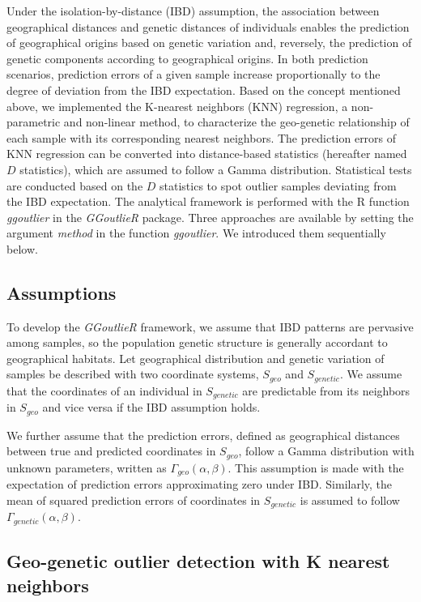 \documentclass[11pt]{article}
\begin{document}
Under the isolation-by-distance (IBD) assumption, the association between geographical distances and genetic distances of individuals enables the prediction of geographical origins based on genetic variation and, reversely, the prediction of genetic components according to geographical origins.
In both prediction scenarios, prediction errors of a given sample increase proportionally to the degree of deviation from the IBD expectation.
Based on the concept mentioned above, we implemented the K-nearest neighbors (KNN) regression, a non-parametric and non-linear method, to characterize the geo-genetic relationship of each sample with its corresponding nearest neighbors.
The prediction errors of KNN regression can be converted into distance-based statistics (hereafter named $D$ statistics), which are assumed to follow a Gamma distribution.
Statistical tests are conducted based on the $D$ statistics to spot outlier samples deviating from the IBD expectation.
The analytical framework is performed with the R function \textit{ggoutlier} in the \textit{GGoutlieR} package.
Three approaches are available by setting the argument \textit{method} in the function \textit{ggoutlier}.
We introduced them sequentially below.

\subsection*{Assumptions}

To develop the \textit{GGoutlieR} framework, we assume that IBD patterns are pervasive among samples, so the population genetic structure is generally accordant to geographical habitats.
Let geographical distribution and genetic variation of samples be described with two coordinate systems, $S_{geo}$ and $S_{genetic}$.
We assume that the coordinates of an individual in $S_{genetic}$ are predictable from its neighbors in $S_{geo}$ and vice versa if the IBD assumption holds.

We further assume that the prediction errors, defined as geographical distances between true and predicted coordinates in $S_{geo}$, follow a Gamma distribution with unknown parameters, written as $\Gamma_{geo}(\alpha,\beta)$. 
This assumption is made with the expectation of prediction errors approximating zero under IBD.
Similarly, the mean of squared prediction errors of coordinates in $S_{genetic}$ is assumed to follow $\Gamma_{genetic}(\alpha,\beta)$.

\subsection*{Geo-genetic outlier detection with K nearest neighbors}
\end{document}
